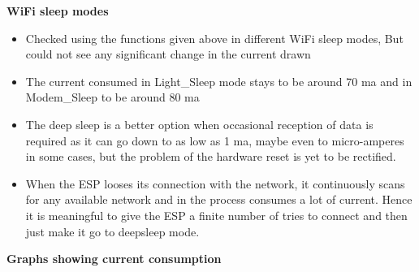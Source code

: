 \documentclass[16pt]{article}
\begin{document}
\textbf{WiFi sleep modes}

\begin{itemize}

\item
  Checked using the functions given above in different WiFi sleep modes,
  But could not see any significant change in the current drawn
\item
  The current consumed in Light\_Sleep mode stays to be around 70 ma and
  in Modem\_Sleep to be aroun\vspace{0.5cm}d 80 ma
\item
  The deep sleep is a better option when occasional reception of data is
  required as it can go down to as low as 1 ma, maybe even to
  micro-amperes in some cases, but the problem of the hardware reset is
  yet to be rectified.
\item
  When the ESP looses its connection with the network, it continuously
  scans for any available network and in the process consumes a lot of
  current. Hence it is meaningful to give the ESP a finite number of
  tries to connect and then just make it go to deepsleep mode.
\end{itemize}


\vspace{0.5cm}
{\Large{\textbf{Graphs showing current
consumption}}}
\end{document}
